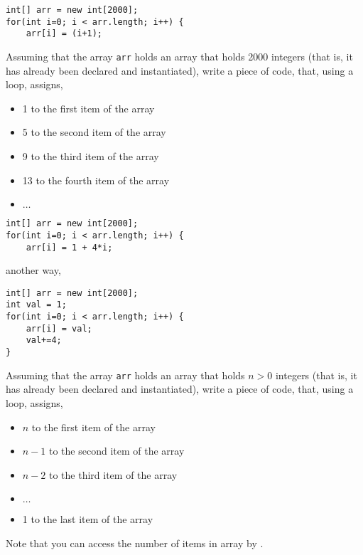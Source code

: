 \begin{questions}
\begin{solution}
\begin{lstlisting}
int[] arr = new int[2000];
for(int i=0; i < arr.length; i++) {
	arr[i] = (i+1);
\end{lstlisting}
\end{solution}

\question Assuming that the array \texttt{arr} holds an array that holds 2000 integers (that is, it has already been declared and instantiated), write a piece of code, that, using a loop, assigns,

	\begin{itemize}
	\item 1 to the first item of the array
	\item 5 to the second item of the array
	\item 9 to the third item of the array
	\item 13 to the fourth item of the array
	\item $\ldots$
	\end{itemize}

\begin{solution}
\begin{lstlisting}
int[] arr = new int[2000];
for(int i=0; i < arr.length; i++) {
	arr[i] = 1 + 4*i;
\end{lstlisting}

another way,

\begin{lstlisting}
int[] arr = new int[2000];
int val = 1;
for(int i=0; i < arr.length; i++) {
	arr[i] = val;
	val+=4;
}
\end{lstlisting}
\end{solution}

\question Assuming that the array \texttt{arr} holds an array that holds $n > 0$ integers (that is, it has already been declared and instantiated), write a piece of code, that, using a loop, assigns,

	\begin{itemize}
	\item $n$ to the first item of the array
	\item $n - 1$ to the second item of the array
	\item $n - 2$ to the third item of the array
	\item $\ldots$
	\item 1 to the last item of the array
	\end{itemize}
	
	Note that you can access the number of items in array  by .
	

\end{questions}
